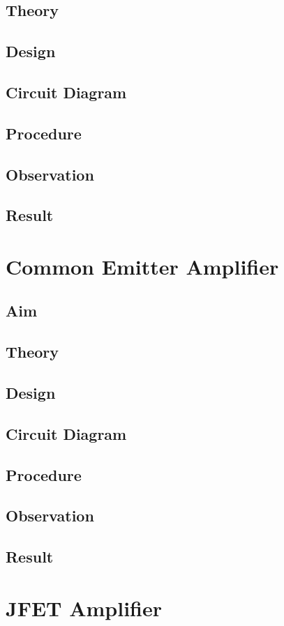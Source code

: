 \documentclass{book}
\begin{document}
\section*{Theory}
\section*{Design}
\section*{Circuit Diagram}
\section*{Procedure}
\section*{Observation}
\section*{Result}
\chapter[Common Emitter Amplifier]{Common Emitter Amplifier}
\section*{Aim}
\section*{Theory}
\section*{Design}
\section*{Circuit Diagram}
\section*{Procedure}
\section*{Observation}
\section*{Result}
\chapter[JFET Amplifier]{JFET Amplifier}
\end{document}
